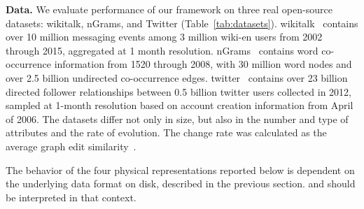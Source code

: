 {\bf Data.}  We evaluate performance of our framework on three real
open-source datasets: wikitalk, nGrams, and Twitter
(Table~\ref{tab:datasets}).  wikitalk~\cite{wikitalk} contains over 10
million messaging events among 3 million wiki-en users from 2002
through 2015, aggregated at 1 month resolution.  nGrams~\cite{nGrams}
contains word co-occurrence information from 1520 through 2008, with
30 million word nodes and over 2.5 billion undirected co-occurrence
edges.  twitter~\cite{twitter} contains over 23 billion directed
follower relationships between 0.5 billion twitter users collected in
2012, sampled at 1-month resolution based on account creation
information from April of 2006.  The datasets differ not
only in size, but also in the number and type of attributes and the
rate of evolution.  The change rate was calculated as the average
graph edit similarity~\cite{Ren2011}.  

The behavior of the four physical representations reported below is
dependent on the underlying data format on disk, described in the
previous section. and should be interpreted in that context.

